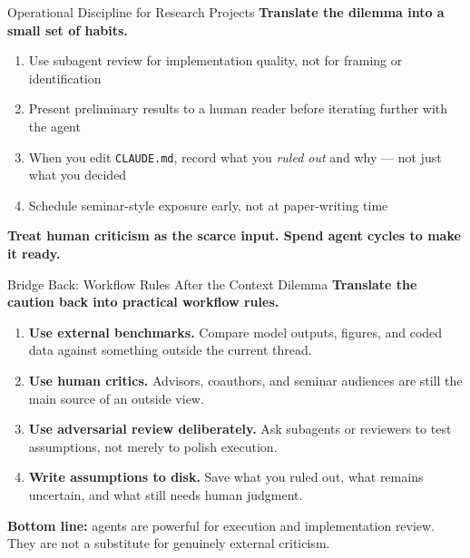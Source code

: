\documentclass[10pt,english,aspectratio=169]{beamer}
\begin{document}
\begin{frame}{Operational Discipline for Research Projects}
\textbf{Translate the dilemma into a small set of habits.}

\vspace{0.25cm}

\begin{enumerate}
    \item Use subagent review for implementation quality, not for framing or identification
    \item Present preliminary results to a human reader before iterating further with the agent
    \item When you edit \texttt{CLAUDE.md}, record what you \textit{ruled out} and why --- not just what you decided
    \item Schedule seminar-style exposure early, not at paper-writing time
\end{enumerate}

\vspace{0.25cm}

\textbf{Treat human criticism as the scarce input. Spend agent cycles to make it ready.}
\end{frame}

\begin{frame}{Bridge Back: Workflow Rules After the Context Dilemma}
\textbf{Translate the caution back into practical workflow rules.}

\vspace{0.3cm}

\begin{enumerate}
    \item \textbf{Use external benchmarks.} Compare model outputs, figures, and coded data against something outside the current thread.
    \item \textbf{Use human critics.} Advisors, coauthors, and seminar audiences are still the main source of an outside view.
    \item \textbf{Use adversarial review deliberately.} Ask subagents or reviewers to test assumptions, not merely to polish execution.
    \item \textbf{Write assumptions to disk.} Save what you ruled out, what remains uncertain, and what still needs human judgment.
\end{enumerate}

\vspace{0.3cm}

\textbf{Bottom line:} agents are powerful for execution and implementation review. They are not a substitute for genuinely external criticism.
\end{frame}
\end{document}
